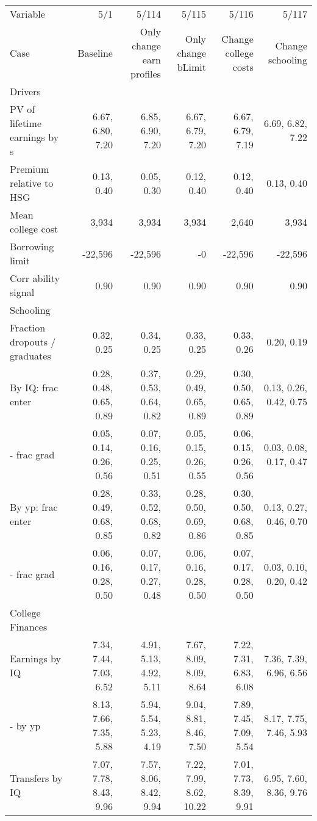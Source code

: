 \begin{tabular}{lrrrrr}
\hline
Variable & 5/1  & 5/114  & 5/115  & 5/116  & 5/117  \\ 
Case & Baseline  & Only change earn profiles  & Only change bLimit  & Change college costs  & Change schooling  \\ 
Drivers &   &   &   &   &   \\ 
PV of lifetime earnings by s & 6.67, 6.80, 7.20  & 6.85, 6.90, 7.20  & 6.67, 6.79, 7.20  & 6.67, 6.79, 7.19  & 6.69, 6.82, 7.22  \\ 
Premium relative to HSG & 0.13, 0.40  & 0.05, 0.30  & 0.12, 0.40  & 0.12, 0.40  & 0.13, 0.40  \\ 
Mean college cost & 3,934  & 3,934  & 3,934  & 2,640  & 3,934  \\ 
Borrowing limit & -22,596  & -22,596  & -0  & -22,596  & -22,596  \\ 
Corr ability signal & 0.90  & 0.90  & 0.90  & 0.90  & 0.90  \\ 
\hline
Schooling &   &   &   &   &   \\ 
Fraction dropouts / graduates & 0.32, 0.25  & 0.34, 0.25  & 0.33, 0.25  & 0.33, 0.26  & 0.20, 0.19  \\ 
By IQ: frac enter & 0.28, 0.48, 0.65, 0.89  & 0.37, 0.53, 0.64, 0.82  & 0.29, 0.49, 0.65, 0.89  & 0.30, 0.50, 0.65, 0.89  & 0.13, 0.26, 0.42, 0.75  \\ 
- frac grad & 0.05, 0.14, 0.26, 0.56  & 0.07, 0.16, 0.25, 0.51  & 0.05, 0.15, 0.26, 0.55  & 0.06, 0.15, 0.26, 0.56  & 0.03, 0.08, 0.17, 0.47  \\ 
By yp: frac enter & 0.28, 0.49, 0.68, 0.85  & 0.33, 0.52, 0.68, 0.82  & 0.28, 0.50, 0.69, 0.86  & 0.30, 0.50, 0.68, 0.85  & 0.13, 0.27, 0.46, 0.70  \\ 
- frac grad & 0.06, 0.16, 0.28, 0.50  & 0.07, 0.17, 0.27, 0.48  & 0.06, 0.16, 0.28, 0.50  & 0.07, 0.17, 0.28, 0.50  & 0.03, 0.10, 0.20, 0.42  \\ 
\hline
College Finances &   &   &   &   &   \\ 
Earnings by IQ & 7.34, 7.44, 7.03, 6.52  & 4.91, 5.13, 4.92, 5.11  & 7.67, 8.09, 8.09, 8.64  & 7.22, 7.31, 6.83, 6.08  & 7.36, 7.39, 6.96, 6.56  \\ 
- by yp & 8.13, 7.66, 7.35, 5.88  & 5.94, 5.54, 5.23, 4.19  & 9.04, 8.81, 8.46, 7.50  & 7.89, 7.45, 7.09, 5.54  & 8.17, 7.75, 7.46, 5.93  \\ 
Transfers by IQ & 7.07, 7.78, 8.43, 9.96  & 7.57, 8.06, 8.42, 9.94  & 7.22, 7.99, 8.62, 10.22  & 7.01, 7.73, 8.39, 9.91  & 6.95, 7.60, 8.36, 9.76  \\ 

\end{tabular}
